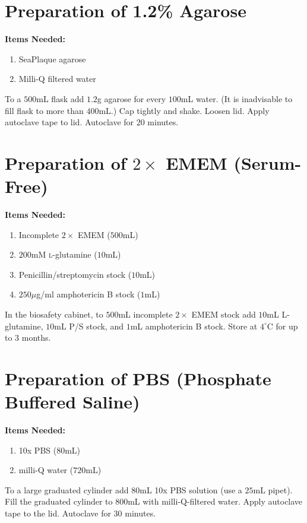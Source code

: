 \section{Preparation of 1.2\% Agarose}

{\bfseries Items Needed:} \begin{enumerate}
	\item SeaPlaque agarose
	\item Milli-Q filtered water
\end{enumerate}

To a $500$mL flask add $1.2$g agarose for every $100$mL water. (It is inadvisable to fill flask to more than $400$mL.) Cap tightly and shake. Loosen lid. Apply autoclave tape to lid. Autoclave for 20 minutes.

\section{Preparation of $2\times$ EMEM (Serum-Free)}

{\bfseries Items Needed:} \begin{enumerate}
	\item Incomplete $2\times$ EMEM ($500$mL)
	\item $200$mM \textsc{l}-glutamine ($10$mL)
	\item Penicillin/streptomycin stock ($10$mL)
	\item $250\mu$g/ml amphotericin B stock ($1$mL)
\end{enumerate}

In the biosafety cabinet, to $500$mL incomplete $2\times$ EMEM stock add $10$mL \textsc{L}-glutamine, $10$mL P/S stock, and $1$mL amphotericin B stock. Store at $4^{\circ}$C for up to 3 months.

\section{Preparation of PBS (Phosphate Buffered Saline)}

{\bfseries Items Needed:} \begin{enumerate}
	\item 10x PBS ($80$mL)
	\item milli-Q water ($720$mL)
\end{enumerate}

To a large graduated cylinder add $80$mL 10x PBS solution (use a $25$mL pipet). Fill the graduated cylinder to $800$mL with milli-Q-filtered water. Apply autoclave tape to the lid. Autoclave for 30 minutes.

